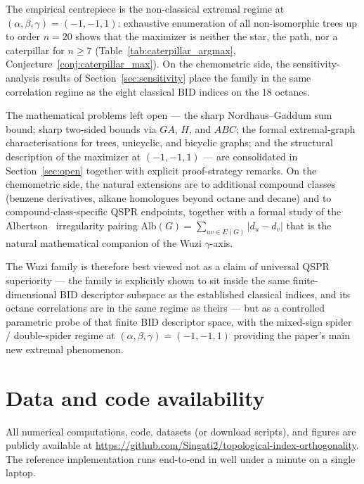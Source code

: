 \documentclass[11pt,a4paper]{article}
\theoremstyle{definition}
\begin{document}
The empirical centrepiece is the non-classical extremal regime at
$(\alpha, \beta, \gamma) = (-1, -1, 1)$: exhaustive enumeration of
all non-isomorphic trees up to order $n = 20$ shows that the
maximizer is neither the star, the path, nor a caterpillar for
$n \ge 7$ (Table~\ref{tab:caterpillar_argmax},
Conjecture~\ref{conj:caterpillar_max}). On the chemometric side,
the sensitivity-analysis results of Section~\ref{sec:sensitivity}
place the family in the same correlation regime as the eight
classical BID indices on the $18$ octanes.

The mathematical problems left open --- the sharp Nordhaus--Gaddum
sum bound; sharp two-sided bounds via $GA$, $H$, and $ABC$; the
formal extremal-graph characterisations for trees, unicyclic, and
bicyclic graphs; and the structural description of the maximizer
at $(-1, -1, 1)$ --- are consolidated in Section~\ref{sec:open}
together with explicit proof-strategy remarks. On the chemometric
side, the natural extensions are to additional compound classes
(benzene derivatives, alkane homologues beyond octane and decane)
and to compound-class-specific QSPR endpoints, together with a
formal study of the Albertson~\cite{Albertson1997} irregularity
pairing $\mathrm{Alb}(G) = \sum_{uv \in E(G)} |d_u - d_v|$ that
is the natural mathematical companion of the Wuzi $\gamma$-axis.

The Wuzi family is therefore best viewed not as a claim of
universal QSPR superiority --- the family is explicitly shown to
sit inside the same finite-dimensional BID descriptor subspace as
the established classical indices, and its octane correlations are
in the same regime as theirs --- but as a controlled parametric
probe of that finite BID descriptor space, with the mixed-sign
spider / double-spider regime at $(\alpha, \beta, \gamma) =
(-1, -1, 1)$ providing the paper's main new extremal phenomenon.

\section*{Data and code availability}

All numerical computations, code, datasets (or download scripts),
and figures are publicly available at
\url{https://github.com/Singati2/topological-index-orthogonality}.
The reference implementation runs end-to-end in well under a
minute on a single laptop.
\end{document}
